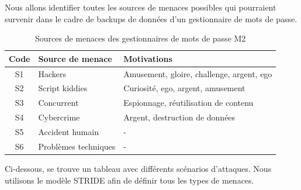 Nous allons identifier toutes les sources de menaces possibles qui pourraient survenir dans le cadre de backups de données d'un gestionnaire de mots de passe. 

\begin{table}[H]
	\centering
	\begin{tabular}{cll}
		\hline
		Code & Source de menace                & Motivations                               \\ \hline
		S1   & Hackers & Amusement, gloire, challenge, argent, ego \\
		S2   & Script kiddies                  & Curiosité, ego, argent, amusement         \\
		S3   & Concurrent                      & Espionnage, réutilisation de contenu      \\
		S4   & Cybercrime                      & Argent, destruction de données            \\
		S5   & Accident humain                 & -                                         \\
		S6   & Problèmes techniques            & -                                         \\ \hline
	\end{tabular}
	\caption{Sources de menaces des gestionnaires de mots de passe M2}
\end{table}

Ci-dessous, se trouve un tableau avec différents scénarios d'attaques. Nous utilisons le modèle STRIDE afin de définir tous les types de menaces. 

